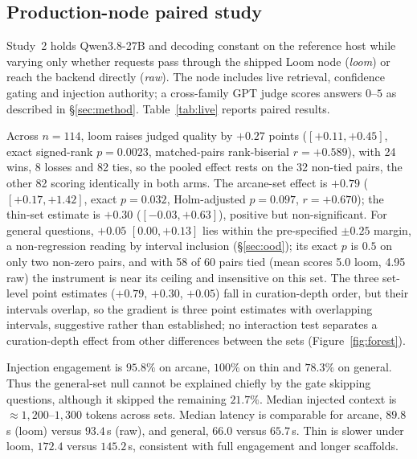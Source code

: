 \documentclass[10pt,twocolumn]{article}
\begin{document}
\subsection{Production-node paired study}\label{sec:live}
Study~2 holds Qwen3.8-27B and decoding constant on the reference host while varying only whether requests pass through the shipped Loom node (\emph{loom}) or reach the backend directly (\emph{raw}). The node includes live retrieval, confidence gating and injection authority; a cross-family GPT judge scores answers $0$--$5$ as described in \S\ref{sec:method}. Table~\ref{tab:live} reports paired results.

Across $n=114$, loom raises judged quality by $\mathbf{+0.27}$ points ($[+0.11,+0.45]$, exact signed-rank $p=0.0023$, matched-pairs rank-biserial $r=+0.589$), with 24 wins, 8 losses and 82 ties, so the pooled effect rests on the 32 non-tied pairs, the other 82 scoring identically in both arms. The arcane-set effect is $\mathbf{+0.79}$ ($[+0.17,+1.42]$, exact $p=0.032$, Holm-adjusted $p=0.097$, $r=+0.670$); the thin-set estimate is $+0.30$ ($[-0.03,+0.63]$), positive but non-significant. For general questions, $+0.05$ $[0.00,+0.13]$ lies within the pre-specified $\pm0.25$ margin, a non-regression reading by interval inclusion (\S\ref{sec:ood}); its exact $p$ is $0.5$ on only two non-zero pairs, and with 58 of 60 pairs tied (mean scores 5.0 loom, 4.95 raw) the instrument is near its ceiling and insensitive on this set. The three set-level point estimates ($+0.79$, $+0.30$, $+0.05$) fall in curation-depth order, but their intervals overlap, so the gradient is three point estimates with overlapping intervals, suggestive rather than established; no interaction test separates a curation-depth effect from other differences between the sets (Figure~\ref{fig:forest}).



Injection engagement is $95.8\%$ on arcane, $100\%$ on thin and $78.3\%$ on general. Thus the general-set null cannot be explained chiefly by the gate skipping questions, although it skipped the remaining $21.7\%$. Median injected context is $\approx1{,}200$--$1{,}300$ tokens across sets. Median latency is comparable for arcane, $89.8$\,s (loom) versus $93.4$\,s (raw), and general, $66.0$ versus $65.7$\,s. Thin is slower under loom, $172.4$ versus $145.2$\,s, consistent with full engagement and longer scaffolds.
\end{document}
